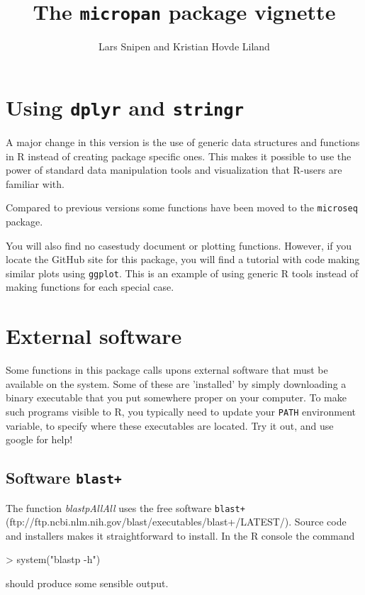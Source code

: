 \documentclass{article}
\title{The \texttt{micropan} package vignette}
\author{Lars Snipen and Kristian Hovde Liland}
\date{}
\begin{document}

\maketitle


\section{Using \texttt{dplyr} and \texttt{stringr}}
A major change in this version is the use of generic data structures and functions in R instead of creating package specific ones. This makes it possible to use the power of standard data manipulation tools and visualization that R-users are familiar with.

Compared to previous versions some functions have been moved to the \texttt{microseq} package.

You will also find no casestudy document or plotting functions. However, if you locate the GitHub site for this package, you will find a tutorial with code making similar plots using \texttt{ggplot}. This is an example of using generic R tools instead of making functions for each special case.



\section{External software}
Some functions in this package calls upons external software that must be available on the system. Some of these are 'installed' by simply downloading a binary executable that you put somewhere proper on your computer. To make such programs visible to R, you typically need to update your \texttt{PATH} environment variable, to specify where these executables are located. Try it out, and use google for help!


\subsection{Software \texttt{blast+}}
The function \emph{blastpAllAll} uses the free software \texttt{blast+} (ftp://ftp.ncbi.nlm.nih.gov/blast/executables/blast+/LATEST/). Source code and installers makes it straightforward to install. In the R console the command
\begin{Schunk}
\begin{Sinput}
> system("blastp -h")
\end{Sinput}
\end{Schunk}
should produce some sensible output.
\end{document}
